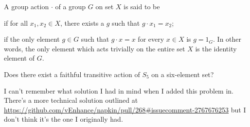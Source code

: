 \begin{problem}
	\onechili
	A group action $\cdot$ of a group $G$ on set $X$ is said to be
	\begin{itemize}
		\ii {} if for all $x_1, x_2 \in X$,
		there exists a $g$ such that $g \cdot x_1 = x_2$;

		\ii {} if the only element $g \in G$
		such that $g \cdot x = x$ for every $x \in X$ is $g = 1_G$.
		In other words, the only element which acts trivially on the entire set $X$
		is the identity element of $G$.
	\end{itemize}
	Does there exist a faithful transitive action of $S_5$ on a six-element set?
  \begin{sol}
    I can't remember what solution I had in mind when I added this problem in.
    There's a more technical solution outlined at
    \url{https://github.com/vEnhance/napkin/pull/268#issuecomment-2767676253}
    but I don't think it's the one I originally had.
  \end{sol}
\end{problem}

